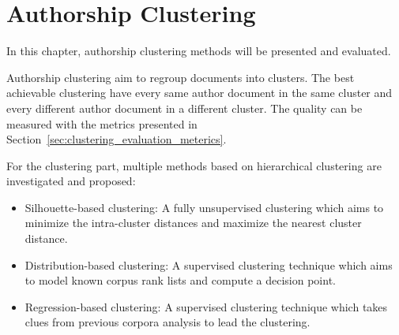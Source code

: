 \chapter{Authorship Clustering \label{sec:clustering}}

In this chapter, authorship clustering methods will be presented and evaluated.

Authorship clustering aim to regroup documents into clusters.
The best achievable clustering have every same author document in the same cluster and every different author document in a different cluster.
The quality can be measured with the metrics presented in Section~\ref{sec:clustering_evaluation_meterics}.

For the clustering part, multiple methods based on hierarchical clustering are investigated and proposed:
\begin{itemize}
  \item
  Silhouette-based clustering: A fully unsupervised clustering which aims to minimize the intra-cluster distances and maximize the nearest cluster distance.
  \item
  Distribution-based clustering: A supervised clustering technique which aims to model known corpus rank lists and compute a decision point.
  \item
  Regression-based clustering: A supervised clustering technique which takes clues from previous corpora analysis to lead the clustering.
\end{itemize}






